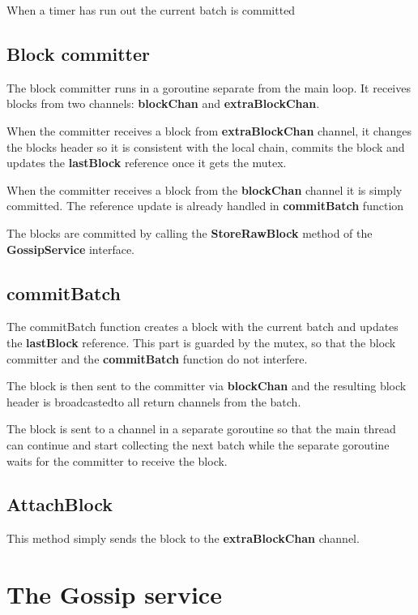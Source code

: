 When a timer has run out the current batch is committed

\subsection*{Block committer}

The block committer runs in a goroutine separate from the main loop. It receives blocks from two channels: \textbf{blockChan} and \textbf{extraBlockChan}.

When the committer receives a block from \textbf{extraBlockChan} channel, it changes the blocks header so it is consistent with the local chain, commits the block and updates the \textbf{lastBlock} reference once it gets the mutex.

When the committer receives a block from the \textbf{blockChan} channel it is simply committed. The reference update is already handled in \textbf{commitBatch} function

The blocks are committed by calling the \textbf{StoreRawBlock} method of the \textbf{GossipService} interface.

\subsection*{commitBatch}

The commitBatch function creates a block with the current batch and updates the \textbf{lastBlock} reference. This part is guarded by the mutex, so that the block committer and the \textbf{commitBatch} function do not interfere.

The block is then sent to the committer via \textbf{blockChan} and the resulting block header is broadcastedto all return channels from the batch.

The block is sent to a channel in a separate goroutine so that the main thread can continue and start collecting the next batch while the separate goroutine waits for the committer to receive the block.

\subsection*{AttachBlock}

This method simply sends the block to the \textbf{extraBlockChan} channel.

\section{The Gossip service}

